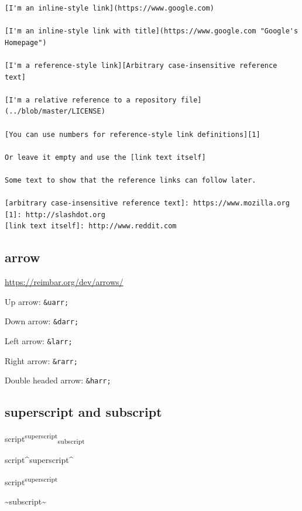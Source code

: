 \documentclass[
]{book}
\newenvironment{Shaded}{\begin{snugshade}}{\end{snugshade}}
\newcommand{\NormalTok}[1]{#1}
\theoremstyle{definition}
\theoremstyle{definition}
\theoremstyle{definition}
\theoremstyle{definition}
\theoremstyle{remark}
\begin{document}
\begin{verbatim}
[I'm an inline-style link](https://www.google.com)

[I'm an inline-style link with title](https://www.google.com "Google's Homepage")

[I'm a reference-style link][Arbitrary case-insensitive reference text]

[I'm a relative reference to a repository file](../blob/master/LICENSE)

[You can use numbers for reference-style link definitions][1]

Or leave it empty and use the [link text itself]

Some text to show that the reference links can follow later.

[arbitrary case-insensitive reference text]: https://www.mozilla.org
[1]: http://slashdot.org
[link text itself]: http://www.reddit.com
\end{verbatim}

\hypertarget{arrow}{%
\subsection{arrow}\label{arrow}}

\url{https://reimbar.org/dev/arrows/}

Up arrow: \texttt{\&uarr;}

Down arrow: \texttt{\&darr;}

Left arrow: \texttt{\&larr;}

Right arrow: \texttt{\&rarr;}

Double headed arrow: \texttt{\&harr;}

\hypertarget{superscript-and-subscript}{%
\subsection{superscript and subscript}\label{superscript-and-subscript}}

script\textsuperscript{superscript}\textsubscript{subscript}

\begin{Shaded}
\begin{Highlighting}[]
\NormalTok{script\^{}superscript\^{}}
\end{Highlighting}
\end{Shaded}

script\textsuperscript{superscript}

\begin{Shaded}
\begin{Highlighting}[]
\NormalTok{\textasciitilde{}subscript\textasciitilde{}}
\end{Highlighting}
\end{Shaded}
\end{document}
